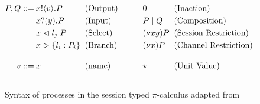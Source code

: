 \begin{figure}[h]
    \centering
    \begin{align*}
            \begin{split}
                P, Q ::=\: & x!\langle v \rangle.P\hspace{2mm} \\
                & x?(y).P\hspace{2mm}\\
                & x \vartriangleleft l_j.P \hspace{2mm}\\
                & x \vartriangleright \{l_i : P_i \} \hspace{2mm}\\[10pt]
                v ::= \: & x \\
            \end{split}
            &
            \begin{split}
                & \text{(Output)}\hspace{7mm}\\
                & \text{(Input)}\hspace{7mm}\\
                & \text{(Select)}\hspace{7mm}\\
                & \text{(Branch)}\hspace{7mm}\\[10pt]
                & \text{(name)}\hspace{7mm}\\    
            \end{split}
            &
            \begin{split}
                & 0 \hspace{2mm}\\
                & P \; | \; Q \hspace{2mm}\\
                & (\nu xy) P \hspace{2mm}\\
                & (\nu x) P \hspace{2mm}\\[10pt]
                & \star \\
            \end{split}
            &
            \begin{split}
                & \text{(Inaction)} \\
                & \text{(Composition)} \\
                & \text{(Session Restriction)} \\
                & \text{(Channel Restriction)} \\[10pt]
                & \text{(Unit Value)} \\
            \end{split}
    \end{align*}
    \noindent\rule{12cm}{0.8pt}
    \caption{Syntax of processes in the session typed $\pi$-calculus adapted from \citep{dardha2017session}}
    \label{fig:procSyntax}
\end{figure}

